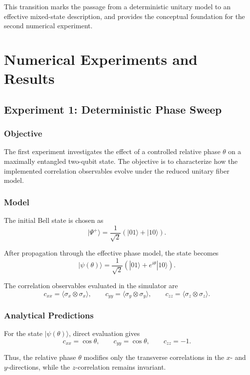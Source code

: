 \documentclass[a4paper]{article}
\begin{document}
This transition marks the passage from a deterministic unitary model to an effective mixed-state description, and provides the conceptual foundation for the second numerical experiment.



\section{Numerical Experiments and Results}

\subsection{Experiment 1: Deterministic Phase Sweep}

\subsubsection{Objective}

The first experiment investigates the effect of a controlled relative phase \(\theta\) on a maximally entangled two-qubit state. The objective is to characterize how the implemented correlation observables evolve under the reduced unitary fiber model.

\subsubsection{Model}

The initial Bell state is chosen as
\[
|\Psi^{+}\rangle
=
\frac{1}{\sqrt{2}}
\left(
|01\rangle + |10\rangle
\right).
\]

After propagation through the effective phase model, the state becomes
\[
|\psi(\theta)\rangle
=
\frac{1}{\sqrt{2}}
\left(
|01\rangle + e^{i\theta}|10\rangle
\right).
\]

The correlation observables evaluated in the simulator are
\[
c_{xx} = \langle \sigma_x \otimes \sigma_x \rangle,\qquad
c_{yy} = \langle \sigma_y \otimes \sigma_y \rangle,\qquad
c_{zz} = \langle \sigma_z \otimes \sigma_z \rangle.
\]

\subsubsection{Analytical Predictions}

For the state \( |\psi(\theta)\rangle \), direct evaluation gives
\[
c_{xx} = \cos\theta,\qquad
c_{yy} = \cos\theta,\qquad
c_{zz} = -1.
\]

Thus, the relative phase \(\theta\) modifies only the transverse correlations in the \(x\)- and \(y\)-directions, while the \(z\)-correlation remains invariant.
\end{document}
